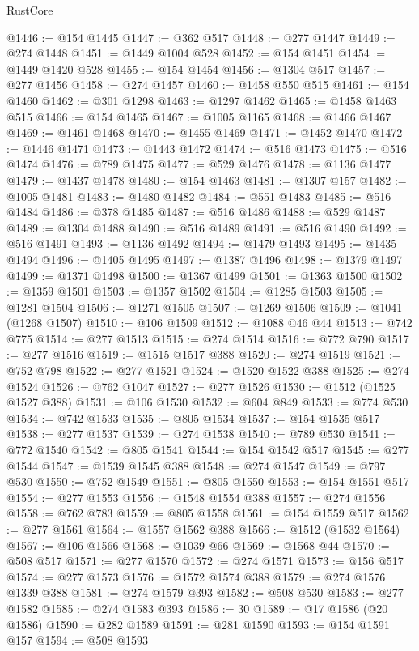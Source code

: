 \begin{lexlean}{RustCore}
\begin{coremodule}
@1446 := @154 @1445
@1447 := @362 @517
@1448 := @277 @1447
@1449 := @274 @1448
@1451 := @1449 @1004 @528
@1452 := @154 @1451
@1454 := @1449 @1420 @528
@1455 := @154 @1454
@1456 := @1304 @517
@1457 := @277 @1456
@1458 := @274 @1457
@1460 := @1458 @550 @515
@1461 := @154 @1460
@1462 := @301 @1298
@1463 := @1297 @1462
@1465 := @1458 @1463 @515
@1466 := @154 @1465
@1467 := @1005 @1165
@1468 := @1466 @1467
@1469 := @1461 @1468
@1470 := @1455 @1469
@1471 := @1452 @1470
@1472 := @1446 @1471
@1473 := @1443 @1472
@1474 := @516 @1473
@1475 := @516 @1474
@1476 := @789 @1475
@1477 := @529 @1476
@1478 := @1136 @1477
@1479 := @1437 @1478
@1480 := @154 @1463
@1481 := @1307 @157
@1482 := @1005 @1481
@1483 := @1480 @1482
@1484 := @551 @1483
@1485 := @516 @1484
@1486 := @378 @1485
@1487 := @516 @1486
@1488 := @529 @1487
@1489 := @1304 @1488
@1490 := @516 @1489
@1491 := @516 @1490
@1492 := @516 @1491
@1493 := @1136 @1492
@1494 := @1479 @1493
@1495 := @1435 @1494
@1496 := @1405 @1495
@1497 := @1387 @1496
@1498 := @1379 @1497
@1499 := @1371 @1498
@1500 := @1367 @1499
@1501 := @1363 @1500
@1502 := @1359 @1501
@1503 := @1357 @1502
@1504 := @1285 @1503
@1505 := @1281 @1504
@1506 := @1271 @1505
@1507 := @1269 @1506
@1509 := @1041 (@1268 @1507)
@1510 := @106 @1509
@1512 := @1088 @46 @44
@1513 := @742 @775
@1514 := @277 @1513
@1515 := @274 @1514
@1516 := @772 @790
@1517 := @277 @1516
@1519 := @1515 @1517 @388
@1520 := @274 @1519
@1521 := @752 @798
@1522 := @277 @1521
@1524 := @1520 @1522 @388
@1525 := @274 @1524
@1526 := @762 @1047
@1527 := @277 @1526
@1530 := @1512 (@1525 @1527 @388)
@1531 := @106 @1530
@1532 := @604 @849
@1533 := @774 @530
@1534 := @742 @1533
@1535 := @805 @1534
@1537 := @154 @1535 @517
@1538 := @277 @1537
@1539 := @274 @1538
@1540 := @789 @530
@1541 := @772 @1540
@1542 := @805 @1541
@1544 := @154 @1542 @517
@1545 := @277 @1544
@1547 := @1539 @1545 @388
@1548 := @274 @1547
@1549 := @797 @530
@1550 := @752 @1549
@1551 := @805 @1550
@1553 := @154 @1551 @517
@1554 := @277 @1553
@1556 := @1548 @1554 @388
@1557 := @274 @1556
@1558 := @762 @783
@1559 := @805 @1558
@1561 := @154 @1559 @517
@1562 := @277 @1561
@1564 := @1557 @1562 @388
@1566 := @1512 (@1532 @1564)
@1567 := @106 @1566
@1568 := @1039 @66
@1569 := @1568 @44
@1570 := @508 @517
@1571 := @277 @1570
@1572 := @274 @1571
@1573 := @156 @517
@1574 := @277 @1573
@1576 := @1572 @1574 @388
@1579 := @274 @1576 @1339 @388
@1581 := @274 @1579 @393
@1582 := @508 @530
@1583 := @277 @1582
@1585 := @274 @1583 @393
@1586 := 30
@1589 := @17 @1586 (@20 @1586)
@1590 := @282 @1589
@1591 := @281 @1590
@1593 := @154 @1591 @157
@1594 := @508 @1593

\end{coremodule}
\end{lexlean}
